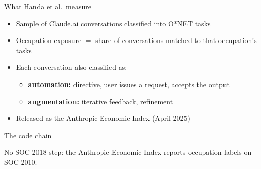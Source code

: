 
\begin{frame}{What Handa et al.\ measure}
\begin{itemize}\setlength{\itemsep}{6pt}
  \item Sample of Claude.ai conversations classified into O*NET tasks
  \item Occupation exposure $=$ share of conversations matched to that occupation's tasks
  \item Each conversation also classified as:
  \begin{itemize}
    \item \textbf{automation:} directive, user issues a request, accepts the output
    \item \textbf{augmentation:} iterative feedback, refinement
  \end{itemize}
  \item Released as the Anthropic Economic Index (April 2025)
\end{itemize}
\end{frame}

\begin{frame}{The code chain}
\centering
{}

\vspace{1.5em}
No SOC 2018 step: the Anthropic Economic Index reports occupation labels on SOC 2010.
\end{frame}

